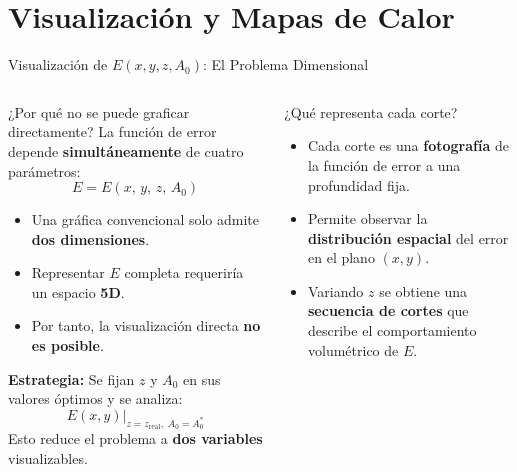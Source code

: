 
\section{Visualización y Mapas de Calor}

\begin{frame}{Visualización de $E(x,y,z,A_0)$: El Problema Dimensional}

    \begin{columns}[T]


        \begin{block}{¿Por qué no se puede graficar directamente?}
            \scriptsize
            La función de error depende \textbf{simultáneamente} de cuatro parámetros:
            \[
                E = E(x,\, y,\, z,\, A_0)
            \]
            \begin{itemize}
                \item Una gráfica convencional solo admite \textbf{dos dimensiones}.
                \item Representar $E$ completa requeriría un espacio \textbf{5D}.
                \item Por tanto, la visualización directa \textbf{no es posible}.
            \end{itemize}
            \vspace{0.15cm}
            \textbf{Estrategia:} Se fijan $z$ y $A_0$ en sus valores óptimos y se analiza:
            \[
                E(x, y)\Big|_{z = z_{\text{real}},\; A_0 = A_0^*}
            \]
            Esto reduce el problema a \textbf{dos variables} visualizables.
        \end{block}


        \begin{block}{¿Qué representa cada corte?}
            \scriptsize
            \begin{itemize}
                \item Cada corte es una \textbf{fotografía} de la función de error a una profundidad fija.
                \vspace{0.15cm}
                \item Permite observar la \textbf{distribución espacial} del error en el plano $(x, y)$.
                \vspace{0.15cm}
                \item Variando $z$ se obtiene una \textbf{secuencia de cortes} que describe el comportamiento volumétrico de $E$.
            \end{itemize}
        \end{block}


\end{columns}
\end{frame}
